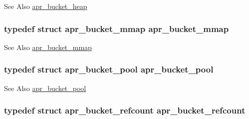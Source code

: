 \begin{DoxySeeAlso}{See Also}
\hyperlink{structapr__bucket__heap}{apr\-\_\-bucket\-\_\-heap} 
\end{DoxySeeAlso}
\hypertarget{group___a_p_r___util___bucket___brigades_ga27ede7c3a29627c7d184dc7cfbc4f767}{
\subsubsection[{apr\-\_\-bucket\-\_\-mmap}]{\setlength{\rightskip}{0pt plus 5cm}typedef struct {\bf apr\-\_\-bucket\-\_\-mmap} {\bf apr\-\_\-bucket\-\_\-mmap}}}\label{group___a_p_r___util___bucket___brigades_ga27ede7c3a29627c7d184dc7cfbc4f767}
\begin{DoxySeeAlso}{See Also}
\hyperlink{structapr__bucket__mmap}{apr\-\_\-bucket\-\_\-mmap} 
\end{DoxySeeAlso}
\hypertarget{group___a_p_r___util___bucket___brigades_ga211e00d871029de148116cd24b070aed}{
\subsubsection[{apr\-\_\-bucket\-\_\-pool}]{\setlength{\rightskip}{0pt plus 5cm}typedef struct {\bf apr\-\_\-bucket\-\_\-pool} {\bf apr\-\_\-bucket\-\_\-pool}}}\label{group___a_p_r___util___bucket___brigades_ga211e00d871029de148116cd24b070aed}
\begin{DoxySeeAlso}{See Also}
\hyperlink{structapr__bucket__pool}{apr\-\_\-bucket\-\_\-pool} 
\end{DoxySeeAlso}
\hypertarget{group___a_p_r___util___bucket___brigades_ga785fd3402961b30315975b0c87c87706}{
\subsubsection[{apr\-\_\-bucket\-\_\-refcount}]{\setlength{\rightskip}{0pt plus 5cm}typedef struct {\bf apr\-\_\-bucket\-\_\-refcount} {\bf apr\-\_\-bucket\-\_\-refcount}}}\label{group___a_p_r___util___bucket___brigades_ga785fd3402961b30315975b0c87c87706}
